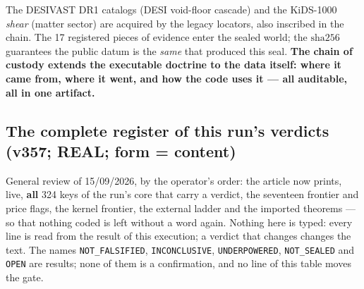 \documentclass[11pt]{article}
\theoremstyle{definition}\newtheorem{deriv}{Derivation}
\begin{document}
The DESIVAST DR1 catalogs (DESI void-floor cascade) and the KiDS-1000 \emph{shear} (matter sector) are acquired by the legacy locators, also inscribed in the chain. The 17 registered pieces of evidence enter the sealed world; the $\mathrm{sha}256$ guarantees the public datum is the \emph{same} that produced this seal. \textbf{The chain of custody extends the executable doctrine to the data itself: where it came from, where it went, and how the code uses it --- all auditable, all in one artifact.}

\subsection*{The complete register of this run's verdicts (v357; REAL; form = content)}

General review of 15/09/2026, by the operator's order: the article now prints, live, \textbf{all} 324 keys of the run's core that carry a verdict, the seventeen frontier and price flags, the kernel frontier, the external ladder and the imported theorems --- so that nothing coded is left without a word again. Nothing here is typed: every line is read from the result of this execution; a verdict that changes changes the text. The names \texttt{NOT\_FALSIFIED}, \texttt{INCONCLUSIVE}, \texttt{UNDERPOWERED}, \texttt{NOT\_SEALED} and \texttt{OPEN} are results; none of them is a confirmation, and no line of this table moves the gate.
\end{document}
